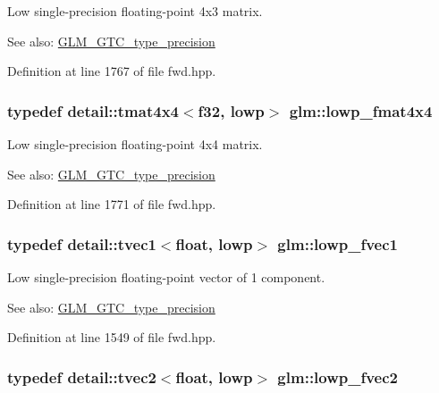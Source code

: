 Low single-precision floating-point 4x3 matrix. \begin{Desc}
\item[See also:]\hyperlink{group__gtc__type__precision}{GLM\_\-GTC\_\-type\_\-precision} \end{Desc}


Definition at line 1767 of file fwd.hpp.\hypertarget{group__gtc__type__precision_g9ff955b170643f547661d2e7263ee426}{
\subsubsection[lowp\_\-fmat4x4]{\setlength{\rightskip}{0pt plus 5cm}typedef detail::tmat4x4$<$f32, lowp$>$ {\bf glm::lowp\_\-fmat4x4}}}
\label{group__gtc__type__precision_g9ff955b170643f547661d2e7263ee426}


Low single-precision floating-point 4x4 matrix. \begin{Desc}
\item[See also:]\hyperlink{group__gtc__type__precision}{GLM\_\-GTC\_\-type\_\-precision} \end{Desc}


Definition at line 1771 of file fwd.hpp.\hypertarget{group__gtc__type__precision_gd5266f0507395cf8cdfe84b9cf5496e4}{
\subsubsection[lowp\_\-fvec1]{\setlength{\rightskip}{0pt plus 5cm}typedef detail::tvec1$<$float, lowp$>$ {\bf glm::lowp\_\-fvec1}}}
\label{group__gtc__type__precision_gd5266f0507395cf8cdfe84b9cf5496e4}


Low single-precision floating-point vector of 1 component. \begin{Desc}
\item[See also:]\hyperlink{group__gtc__type__precision}{GLM\_\-GTC\_\-type\_\-precision} \end{Desc}


Definition at line 1549 of file fwd.hpp.\hypertarget{group__gtc__type__precision_gf365442c52322b810bc0ed943e539229}{
\subsubsection[lowp\_\-fvec2]{\setlength{\rightskip}{0pt plus 5cm}typedef detail::tvec2$<$float, lowp$>$ {\bf glm::lowp\_\-fvec2}}}
\label{group__gtc__type__precision_gf365442c52322b810bc0ed943e539229}


